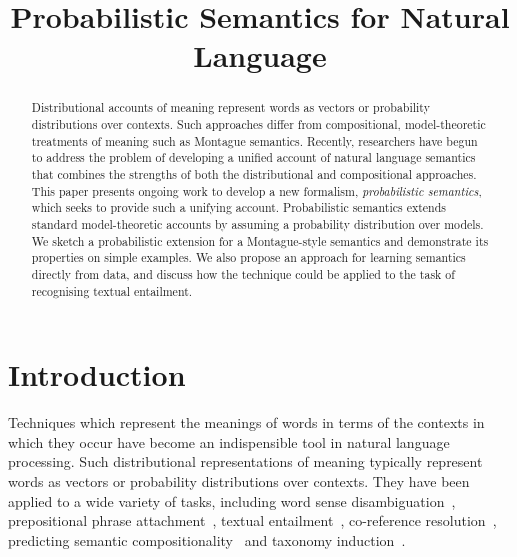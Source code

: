 \documentclass[letterpaper]{article}
\begin{document}
%
\title{Probabilistic Semantics for Natural Language}
\author{}
\maketitle
\begin{abstract}
  Distributional accounts of meaning represent words as vectors or
  probability distributions over contexts. Such approaches differ from
  compositional, model-theoretic treatments of meaning such as
  Montague semantics. Recently, researchers have begun to address the
  problem of developing a unified account of natural language
  semantics that combines the strengths of both the distributional and
  compositional approaches. This paper presents ongoing work to
  develop a new formalism, {\em probabilistic semantics\/}, which
  seeks to provide such a unifying account. Probabilistic semantics
  extends standard model-theoretic accounts by assuming a probability
  distribution over models. We sketch a probabilistic extension for a
  Montague-style semantics and demonstrate its properties on simple
  examples. We also propose an approach for learning semantics
  directly from data, and discuss how the technique could be applied
  to the task of recognising textual entailment.
\end{abstract}


\section{Introduction}

Techniques which represent the meanings of words in terms of the contexts in
which they occur have become an indispensible tool in natural language
processing. Such distributional representations of meaning typically
represent words as vectors or probability distributions over
contexts. They have been applied to a wide variety of tasks,
including word sense
disambiguation~\cite{miller-EtAl:2012:PAPERS,khapra-EtAl:2010:ACL},
prepositional phrase
attachment~\cite{Calvo05distributionalthesaurus}, textual
entailment~\cite{berant-dagan-goldberger:2010:ACL}, co-reference
resolution~\cite{lee-EtAl:2012:EMNLP-CoNLL}, predicting semantic
compositionality~\cite{bergsma-EtAl:2010:EMNLP} and taxonomy
induction~\cite{fountain-lapata:2012:NAACL-HLT}.
\end{document}
